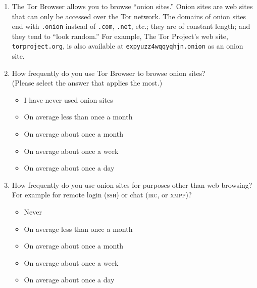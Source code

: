 \begin{enumerate}
    \item The Tor Browser allows you to browse ``onion sites.'' Onion sites are
        web sites that can only be accessed over the Tor network. The domains of
        onion sites end with \texttt{.onion} instead of \texttt{.com},
        \texttt{.net}, etc.; they are of constant length; and they tend to
        ``look random.'' For example, The Tor Project's web site,
        \texttt{torproject.org}, is also available at
        \texttt{expyuzz4wqqyqhjn.onion} as an onion site.

    \item How frequently do you use Tor Browser to browse onion sites?\\(Please
        select the answer that applies the most.)
        \begin{itemize}[label=$\Circle$]
            \item I have never used onion sites
            \item On average less than once a month
            \item On average about once a month
            \item On average about once a week
            \item On average about once a day
        \end{itemize}

    \item How frequently do you use onion sites for purposes other than web
        browsing? For example for remote login (\textsc{ssh}) or chat
        (\textsc{irc}, or \textsc{xmpp})?
        \begin{itemize}[label=$\Circle$]
            \item Never
            \item On average less than once a month
            \item On average about once a month
            \item On average about once a week
            \item On average about once a day
        \end{itemize}


\end{enumerate}
